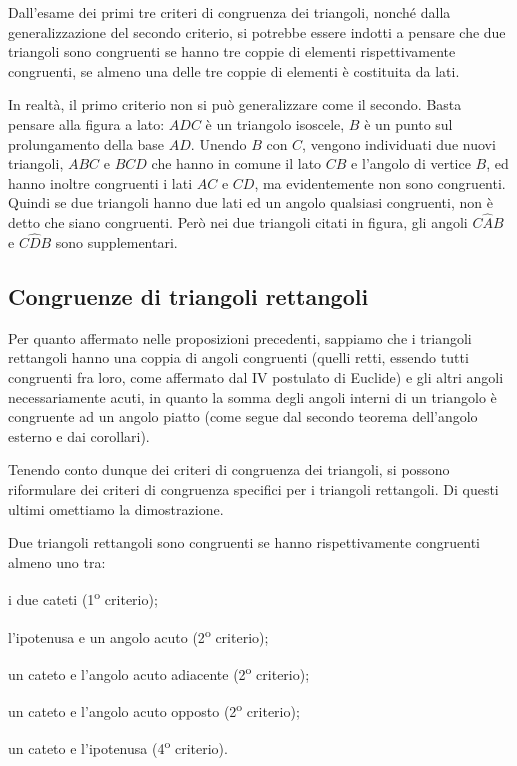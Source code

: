 \osservazione Dall'esame dei primi tre criteri di congruenza dei 
triangoli, nonché dalla generalizzazione del secondo criterio, si 
potrebbe essere indotti a pensare che due triangoli sono congruenti 
se hanno tre coppie di elementi rispettivamente congruenti, se almeno 
una delle tre coppie di elementi è costituita da lati.

\noindent \begin{minipage}{0.6\textwidth}
  In realtà, il primo criterio non si può generalizzare come il 
  secondo. Basta pensare alla figura a lato: \(ADC\) è un triangolo 
  isoscele, \(B\) è un punto sul prolungamento della base \(AD\). Unendo \(B\) 
  con \(C\), vengono individuati due nuovi triangoli, \(ABC\) e \(BCD\) che 
  hanno in comune il lato \(CB\) e l'angolo di vertice \(B\), ed hanno 
  inoltre congruenti i lati \(AC\) e \(CD\), ma evidentemente non sono 
  congruenti. Quindi se due triangoli hanno due lati ed un angolo 
  qualsiasi congruenti, non è detto che siano congruenti. Però nei due 
  triangoli citati in figura, gli angoli \(C\widehat{A}B\) e 
  \(C\widehat{D}B\) sono supplementari.
\end{minipage}\hfil
\begin{minipage}{0.4\textwidth}
  \centering
\end{minipage}


\subsection{Congruenze di triangoli rettangoli}

Per quanto affermato nelle proposizioni precedenti, sappiamo che i 
triangoli rettangoli hanno una coppia di angoli congruenti (quelli 
retti, essendo tutti congruenti fra loro, come affermato dal IV 
postulato di Euclide) e gli altri angoli necessariamente acuti, in 
quanto la somma degli angoli interni di un triangolo è congruente ad 
un angolo piatto (come segue dal secondo teorema dell'angolo esterno 
e dai corollari).

Tenendo conto dunque dei criteri di congruenza dei triangoli, si 
possono riformulare dei criteri di congruenza specifici per i 
triangoli rettangoli. Di questi ultimi omettiamo la dimostrazione. 

\begin{teorema}
  Due triangoli rettangoli sono congruenti se hanno rispettivamente 
  congruenti almeno uno tra:
  \begin{itemize*}
    \item i due cateti (1\textsuperscript{o} criterio);
    \item l'ipotenusa e un angolo acuto (2\textsuperscript{o} criterio);
    \item un cateto e l'angolo acuto adiacente (2\textsuperscript{o} 
    criterio);
    \item un cateto e l'angolo acuto opposto (2\textsuperscript{o} 
    criterio);
    \item un cateto e l'ipotenusa (4\textsuperscript{o} criterio).
  \end{itemize*}
\end{teorema}

